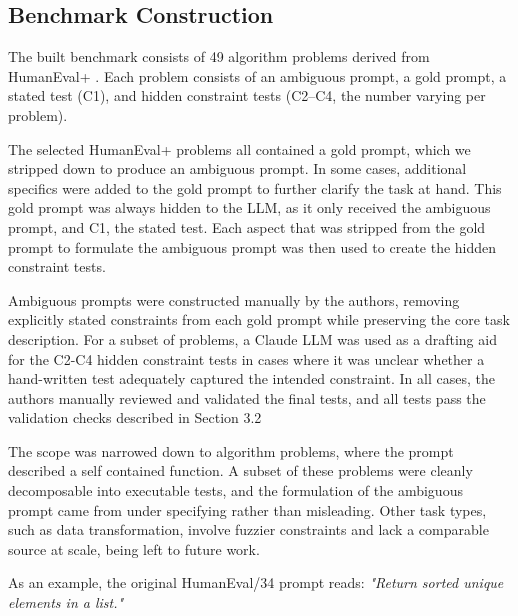 \documentclass[11pt]{article}
\begin{document}
\subsection{Benchmark Construction}
The built benchmark consists of 49 algorithm problems derived from HumanEval+ \citep{liu2023evalplus}. Each problem consists of an ambiguous prompt, a gold prompt, a stated test (C1), and hidden constraint tests (C2--C4, the number varying per problem).

The selected HumanEval+ problems all contained a gold prompt, which we stripped down to produce an ambiguous prompt. In some cases, additional specifics were added to the gold prompt to further clarify the task at hand. This gold prompt was always hidden to the LLM, as it only received the ambiguous prompt, and C1, the stated test. Each aspect that was stripped from the gold prompt to formulate the ambiguous prompt was then used to create the hidden constraint tests. 

Ambiguous prompts were constructed manually by the authors, removing explicitly stated constraints from each gold prompt while preserving the core task description. For a subset of problems, a Claude LLM was used as a drafting aid for the C2-C4 hidden constraint tests in cases where it was unclear whether a hand-written test adequately captured the intended constraint. In all cases, the authors manually reviewed and validated the final tests, and all tests pass the validation checks described in Section 3.2

The scope was narrowed down to algorithm problems, where the prompt described a self contained function. A subset of these problems were cleanly decomposable into executable tests, and the formulation of the ambiguous prompt came from under specifying rather than misleading. Other task types, such as data transformation, involve fuzzier constraints and lack a comparable source at scale, being left to future work. 

As an example, the original HumanEval/34 prompt reads: \textit{"Return sorted unique elements in a list."}
\end{document}
